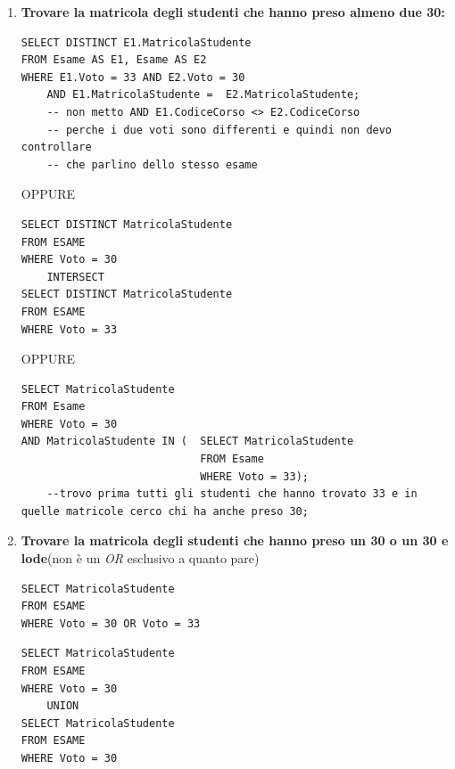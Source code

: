 \documentclass{article}
\begin{document}
\begin{enumerate}
\textit{Soluzione ugualmente valida della prof}
\begin{lstlisting}[style=sqlstyle]
SELECT DISTINCT E1.MatricolaStudente
FROM Esame as E1, Esame as E2
WHERE E1.MatricolaStudente =  E2.MatricolaStudente
AND E1.CodiceCorso <> E2.CodiceCorso;
\end{lstlisting}

\item \textbf{Trovare la matricola degli studenti che hanno preso almeno due 30:}
\begin{lstlisting}[style=sqlstyle]
SELECT DISTINCT E1.MatricolaStudente
FROM Esame AS E1, Esame AS E2
WHERE E1.Voto = 33 AND E2.Voto = 30
	AND E1.MatricolaStudente =  E2.MatricolaStudente;
	-- non metto AND E1.CodiceCorso <> E2.CodiceCorso
	-- perche i due voti sono differenti e quindi non devo controllare
	-- che parlino dello stesso esame
\end{lstlisting}

OPPURE

\begin{lstlisting}[style=sqlstyle]
SELECT DISTINCT MatricolaStudente 
FROM ESAME
WHERE Voto = 30
	INTERSECT
SELECT DISTINCT MatricolaStudente 
FROM ESAME
WHERE Voto = 33
\end{lstlisting}

OPPURE

\begin{lstlisting}[style=sqlstyle]
SELECT MatricolaStudente
FROM Esame
WHERE Voto = 30
AND MatricolaStudente IN ( 	SELECT MatricolaStudente
						 	FROM Esame
						 	WHERE Voto = 33);
	--trovo prima tutti gli studenti che hanno trovato 33 e in quelle matricole cerco chi ha anche preso 30;
\end{lstlisting}

\item \textbf{Trovare la matricola degli studenti che hanno preso un 30 o un 30 e lode}(non è un \textit{OR} esclusivo a quanto pare)

\begin{lstlisting}[style=sqlstyle]
SELECT MatricolaStudente 
FROM ESAME
WHERE Voto = 30 OR Voto = 33
\end{lstlisting}

\begin{lstlisting}[style=sqlstyle]
SELECT MatricolaStudente 
FROM ESAME
WHERE Voto = 30
	UNION
SELECT MatricolaStudente 
FROM ESAME
WHERE Voto = 30	
\end{lstlisting}


\end{enumerate}
\end{document}
